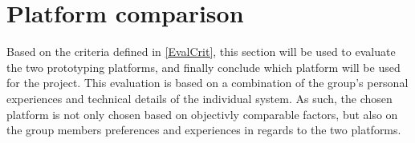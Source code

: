 \section{Platform comparison}
Based on the criteria defined in \autoref{EvalCrit}, this section will be used
to evaluate the two prototyping platforms, and finally conclude which platform
will be used for the \name project. This evaluation is based on a combination of
the group's personal experiences and technical details of the individual system.
As such, the chosen platform is not only chosen based on objectivly comparable
factors, but also on the group members preferences and experiences in regards to
the two platforms.


